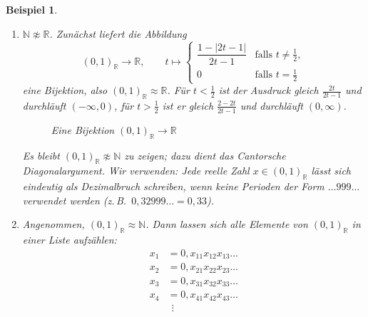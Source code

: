 \documentclass[a4paper]{article}
\makeatletter
\theoremstyle{kurzskript}
\newtheorem{beispiel}[satz]{Beispiel}
\renewenvironment{proof}[1][\proofname]{\par\pushQED{\qed}%
  \normalfont\topsep\medskipamount\relax
  \trivlist\item[\hskip\labelsep\bfseries #1\@addpunct{.}]\ignorespaces}%
  {\popQED\endtrivlist\@endpefalse}
\renewcommand{\proofname}{Beweis}
\newcommand{\N}{\mathbb{N}}
\newcommand{\R}{\mathbb{R}}
\makeatother
\begin{document}
\begin{beispiel}
\begin{enumerate}[label=(\alph*)]
  \item $\N \not\approx \R$. Zunächst liefert die Abbildung
  \[
    (0, 1)_\R \to \R, \qquad t \mapsto
    \begin{cases}
      \dfrac{1 - |2t - 1|}{2t - 1} & \text{falls } t \neq \tfrac12,\\[1ex]
      0 & \text{falls } t = \tfrac12
    \end{cases}
  \]
  eine Bijektion, also $(0, 1)_\R \approx \R$. Für $t < \frac12$ ist der Ausdruck gleich $\frac{2t}{2t - 1}$ und durchläuft $(-\infty, 0)$, für $t > \frac12$ ist er gleich $\frac{2 - 2t}{2t - 1}$ und durchläuft $(0, \infty)$.
  \begin{figure}[H]
  \centering
  \caption{Eine Bijektion $(0, 1)_\R \to \R$}
  \end{figure}
  Es bleibt $(0, 1)_\R \not\approx \N$ zu zeigen; dazu dient das \emph{Cantorsche Diagonalargument}. Wir verwenden: Jede reelle Zahl $x \in (0, 1)_\R$ lässt sich \emph{eindeutig} als Dezimalbruch schreiben, wenn keine Perioden der Form $\dots 999\dots$ verwendet werden (z.\,B.\ $0{,}32999\ldots = 0{,}33$).
  \begin{proof}
  Angenommen, $(0, 1)_\R \approx \N$. Dann lassen sich alle Elemente von $(0, 1)_\R$ in einer Liste aufzählen:
  \begin{align*}
    x_1 &= 0{,}x_{11}x_{12}x_{13}\dots\\
    x_2 &= 0{,}x_{21}x_{22}x_{23}\dots\\
    x_3 &= 0{,}x_{31}x_{32}x_{33}\dots\\
    x_4 &= 0{,}x_{41}x_{42}x_{43}\dots\\
        &\ \ \vdots

\end{align*}
\end{proof}
\end{enumerate}
\end{beispiel}
\end{document}
